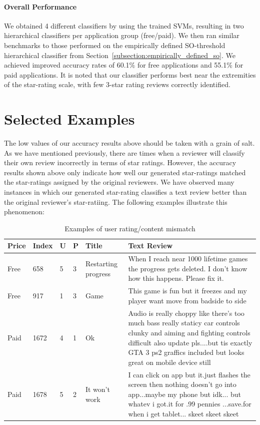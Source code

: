 \documentclass[11pt]{report} %
\begin{document}
\paragraph{Overall Performance}
We obtained 4 different classifiers by using the trained SVMs, resulting in two hierarchical classifiers per application group (free/paid). We then ran similar benchmarks to those performed on the empirically defined SO-threshold hierarchical classifier from Section~\ref{subsection:empirically_defined_so}. We achieved improved accuracy rates of 60.1\% for free applications and 55.1\% for paid applications. It is noted that our classifier performs best near the extremities of the star-rating scale, with few 3-star rating reviews correctly identified.

\section{Selected Examples}

The low values of our accuracy results above should be taken with a grain of salt. As we have mentioned previously, there are times when a reviewer will classify their own review incorrectly in terms of star ratings. However, the accuracy results shown above only indicate how well our generated star-ratings matched the star-ratings assigned by the original reviewers. We have observed many instances in which our generated star-rating classifies a text review better than the original reviewer's star-ratiing. The following examples illustrate this phenomenon:

\newpage

\begin{table}[h]
	\centering
    \begin{tabularx}{\textwidth}{ l | l | l | l |  l | X }
    \hline\hline
		Price  & Index & U & P & Title & Text Review\\ 
    \hline
    \hline
		Free & 658 & 5 & 3 & Restarting progress & When I reach near 1000 lifetime
		games the progress gets deleted. I don't know how this happens. Please fix
		it. \\
    \hline
		Free & 917 & 1 & 3 & Game & This game is fun but it freezes and my player
		want move from badside to side \\
    \hline
		Paid & 1672 & 4 & 1 & Ok & Audio is really choppy like there's too much bass
		really staticy car controls clunky and aiming and fighting controls
		difficult also update pls....but tis exactly GTA 3 ps2 graffics included but looks 
		great on mobile device still \\
    \hline
		Paid & 1678 & 5 & 2 & It won't work & I can click on app but it.just flashes the screen then nothing 
                  doesn't go into app...maybe my phone but idk... but whatev i got.it 
                  for .99 pennies ...save.for when i get tablet... skeet skeet
									skeet \\
    \hline
    \end{tabularx}
\caption{Examples of user rating/content mismatch}
\label{fig:postags_}
\end{table}
\end{document}
